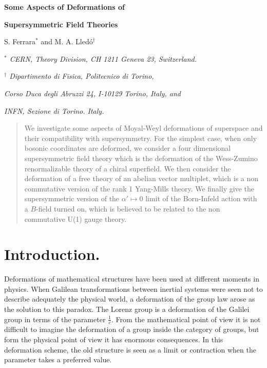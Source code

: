 \documentclass[a4paper,12pt]{article}
\begin{document}
\newcommand{\R}{{\bf R}}
\newcommand{\C}{{\bf C}}
\newcommand{\Z}{{\bf Z}}



\vskip 2.5cm

  \centerline{\Large \bf Some Aspects of Deformations of}
\bigskip
\centerline {\Large\bf  Supersymmetric Field Theories}

\vskip 2.5cm

\centerline{S. Ferrara$^*$ and M. A. Lled\'o$^\dagger$}
\bigskip
\bigskip

\centerline{\it $^*$ CERN, Theory Division, CH 1211 Geneva 23,
Switzerland.} 
\bigskip
\centerline{\it $^\dagger$ Dipartimento di Fisica, Politecnico di Torino,}
\centerline{\it Corso Duca degli Abruzzi 24, I-10129 Torino, Italy, and}
\centerline{\it INFN, Sezione di Torino. Italy.}
\vskip 2cm
\begin{abstract}
  We investigate some aspects of Moyal-Weyl deformations of superspace and
their compatibility
 with supersymmetry. For the simplest case, when only bosonic coordinates
are deformed,
we consider a four dimensional supersymmetric field theory which is the
deformation of the 
Wess-Zumino renormalizable theory of a chiral superfield. We then consider
the deformation of 
a free theory of  an abelian vector multiplet, which is a non commutative
version of the rank 1 
Yang-Mills theory.  We finally  give the supersymmetric version of the 
$\alpha' \mapsto 0$ limit of the Born-Infeld action with a $B$-field
turned on,
 which is believed to be related to the  non commutative U(1) gauge
theory.

\end{abstract}



\vfill\eject
\section{Introduction.}

Deformations of mathematical structures have been used at different
moments in physics. 
When Galilean transformations between inertial systems were seen not to 
describe adequately the physical world, a deformation of the group law
 arose as the solution to this paradox. The Lorenz group
 is a deformation of the Galilei group in terms of the parameter
$\frac{1}{c}$. From the
mathematical point of view it is not difficult to imagine the deformation
of a group
inside the category of groups, but form the physical point of view it has
enormous
consequences. In this deformation scheme, the old structure is seen as a
limit or 
contraction when the parameter takes a preferred value.
\end{document}

